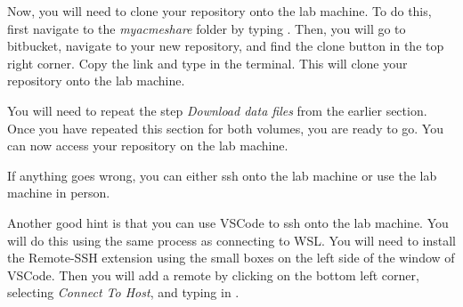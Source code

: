 Now, you will need to clone your repository onto the lab machine.
To do this, first navigate to the \emph{myacmeshare} folder by typing .
Then, you will go to bitbucket, navigate to your new repository, and find the clone button in the top right corner.
Copy the link and type  in the terminal.
This will clone your repository onto the lab machine.

You will need to repeat the step \emph{Download data files} from the earlier section.
Once you have repeated this section for both volumes, you are ready to go.
You can now access your repository on the lab machine.

If anything goes wrong, you can either ssh onto the lab machine or use the lab machine in person.

Another good hint is that you can use VSCode to ssh onto the lab machine.
You will do this using the same process as connecting to WSL.
You will need to install the Remote-SSH extension using the small boxes on the left side of the window of VSCode.
Then you will add a remote by clicking on the bottom left corner, selecting \emph{Connect To Host}, and typing in .
\fi
\ifbootcamp
